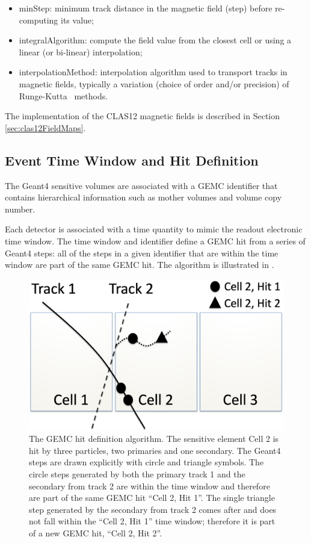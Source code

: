 \begin{itemize}
	\item minStep: minimum track distance in the magnetic field (step) before re-computing its value;
	\item integralAlgorithm: compute the field value from the closest cell or using a linear (or bi-linear) interpolation;
	\item interpolationMethod: interpolation algorithm used to transport tracks in magnetic fields, typically
		  a variation (choice of order and/or precision) of Runge-Kutta~\cite{rungeKutta} methods.
\end{itemize}

The implementation of the CLAS12 magnetic fields is described in Section \ref{sec:clas12FieldMaps}.

\subsection{Event Time Window and Hit Definition}

The Geant4 sensitive volumes are associated with a GEMC identifier that contains hierarchical information such as
mother volumes and volume copy number.

Each detector is associated with a time quantity to mimic the readout electronic time window. The time window and identifier
define a GEMC hit from a series of Geant4 steps: all of the steps in a given identifier that are within the time window
are part of the same GEMC hit. The algorithm is illustrated in .

\begin{figure}
	\centering
	\includegraphics[width=0.99\columnwidth,keepaspectratio]{img/hitDefinition.png}
	\caption{The GEMC hit definition algorithm. The sensitive element Cell 2 is hit by three particles, two primaries
          and one secondary. The Geant4 steps are drawn explicitly with circle and triangle symbols. The circle steps
          generated by both the primary track 1 and the secondary from track 2 are within the time window and therefore
          are part of the same GEMC hit ``Cell 2, Hit 1''. The single triangle step generated by the secondary from track
          2 comes after and does not fall within the ``Cell 2, Hit 1'' time window; therefore it is part of a new GEMC hit,
          ``Cell 2, Hit 2''.}
	\label{fig:hitDefinition}
\end{figure}

